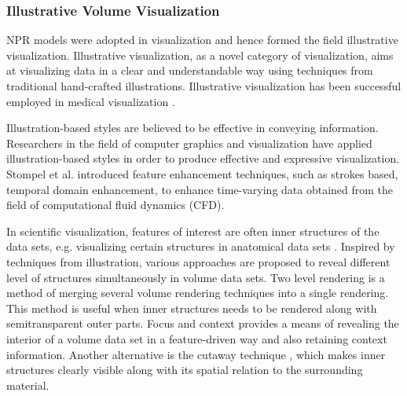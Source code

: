 \subsubsection{Illustrative Volume Visualization}
NPR models were adopted in visualization and hence formed the field illustrative visualization.
Illustrative visualization, as a novel category of visualization, aims at visualizing data in a clear and understandable way using techniques from traditional hand-crafted illustrations.
Illustrative visualization has been successful employed in medical visualization \cite{svakhine_illustration_2005} \cite{viola_importance-driven_2005} \cite{svakhine_illustration-inspired_2009}.

Illustration-based styles are believed to be effective in conveying information. Researchers in the field of computer graphics and visualization have applied illustration-based styles in order to produce effective and expressive visualization. Stompel et al. \cite{stompel_visualization_2002} introduced feature enhancement techniques, such as strokes based, temporal domain enhancement, to enhance time-varying data obtained from the field of computational fluid dynamics (CFD).

In scientific visualization, features of interest are often inner structures of the data sets, e.g. visualizing certain structures in anatomical data sets \cite{diaz_iriberri_enhanced_2013}.
Inspired by techniques from illustration, various approaches are proposed to reveal different level of structures simultaneously in volume data sets.
Two level rendering \cite{hauser_two-level_2001} \cite{hadwiger_high-quality_2003} \cite{corcoran_perceptual_2010} is a method of merging several volume rendering techniques into a single rendering. This method is useful when inner structures needs to be rendered along with semitransparent outer parts.
Focus and context \cite{wang_magic_2005} \cite{bruckner_illustrative_2006} \cite{chen_intelligent_2008} provides a means of revealing the interior of a volume data set in a feature-driven way and also retaining context information.
Another alternative is the cutaway technique \cite{burns_feature_2007} \cite{sigg_intelligent_2012}, which makes inner structures clearly visible along with its spatial relation to the surrounding material.

